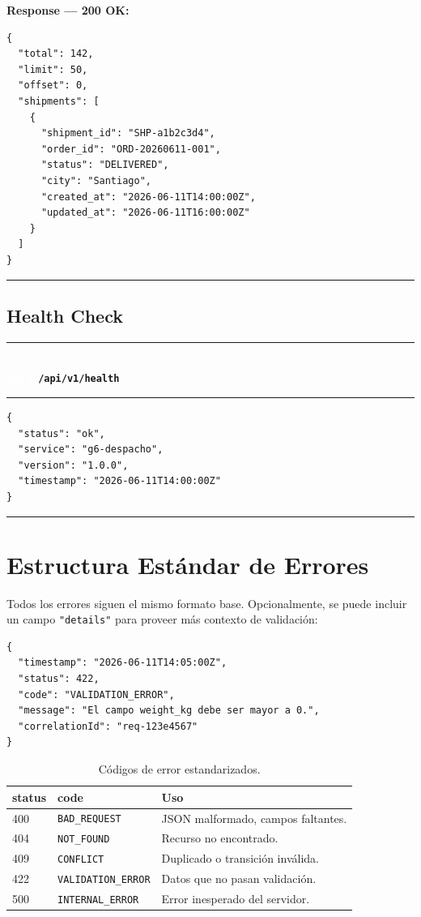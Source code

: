 \documentclass[11pt, a4paper]{article}
\newcommand{\httpmethod}[2]{%
  \colorbox{#1}{\textcolor{white}{\textbf{\small\textsf{#2}}}}%
}
\newcommand{\routeheader}[3]{%
  \noindent\rule{\textwidth}{1.5pt}\\[0.3em]
  \httpmethod{#1}{#2}\;\texttt{\bfseries #3}\\[0.3em]
  \rule{\textwidth}{0.4pt}
  \vspace{0.3cm}
}
\begin{document}
\textbf{Response --- 200 OK:}

\begin{lstlisting}
{
  "total": 142,
  "limit": 50,
  "offset": 0,
  "shipments": [
    {
      "shipment_id": "SHP-a1b2c3d4",
      "order_id": "ORD-20260611-001",
      "status": "DELIVERED",
      "city": "Santiago",
      "created_at": "2026-06-11T14:00:00Z",
      "updated_at": "2026-06-11T16:00:00Z"
    }
  ]
}
\end{lstlisting}

\noindent\rule{\textwidth}{0.4pt}

\subsection{Health Check}

\routeheader{get}{GET}{/api/v1/health}

\begin{lstlisting}
{
  "status": "ok",
  "service": "g6-despacho",
  "version": "1.0.0",
  "timestamp": "2026-06-11T14:00:00Z"
}
\end{lstlisting}

\noindent\rule{\textwidth}{0.4pt}


\section{Estructura Estándar de Errores}
\label{sec:errores}

Todos los errores siguen el mismo formato base. Opcionalmente, se puede incluir un campo \texttt{"details"} para proveer más contexto de validación:

\begin{lstlisting}
{
  "timestamp": "2026-06-11T14:05:00Z",
  "status": 422,
  "code": "VALIDATION_ERROR",
  "message": "El campo weight_kg debe ser mayor a 0.",
  "correlationId": "req-123e4567"
}
\end{lstlisting}

\begin{table}[h!]
\centering
\renewcommand{\arraystretch}{1.3}
\begin{tabularx}{\textwidth}{l l X}
  \toprule
  \textbf{status} & \textbf{code} & \textbf{Uso} \\
  \midrule
  400 & \texttt{BAD\_REQUEST}      & JSON malformado, campos faltantes. \\
  404 & \texttt{NOT\_FOUND}        & Recurso no encontrado. \\
  409 & \texttt{CONFLICT}          & Duplicado o transición inválida. \\
  422 & \texttt{VALIDATION\_ERROR} & Datos que no pasan validación. \\
  500 & \texttt{INTERNAL\_ERROR}   & Error inesperado del servidor. \\
  \bottomrule
\end{tabularx}
\caption{Códigos de error estandarizados.}
\end{table}
\end{document}
